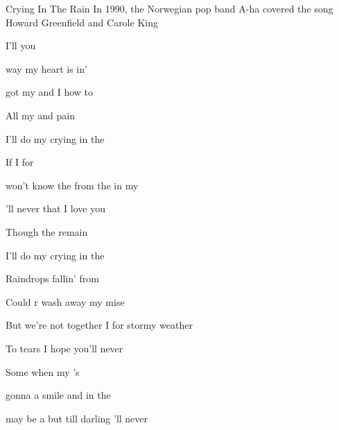 \begin{SBSong}{Crying In The Rain}
  {In 1990, the Norwegian pop band A-ha covered the song}
  {Howard Greenfield and Carole King}
  \begin{SBVerse}
     I'll   you  
    
     way my  heart is in'  
    
     got my  and I  how to  
    
    All my  and pain  
    
    I'll do my crying in the   
  \end{SBVerse}
  \begin{SBVerse}
     If I  for   
    
     won't know the  from the  in my 
 
    'll never  that I  love you  
    
    Though the  remain  
    
    I'll do my crying in the    
  \end{SBVerse}
  \begin{SBChorus}
     Raindrops fallin' from  
    
    Could r wash away my mise
    
    But  we're not together I  for stormy weather 
    
    To   tears I hope you'll never  
  \end{SBChorus}
  \begin{SBVerse}
     Some  when my 's 
 
     gonna  a smile and  in the 
 
     may be a  but till  darling 'll never 
    

\end{SBVerse}
\end{SBSong}
